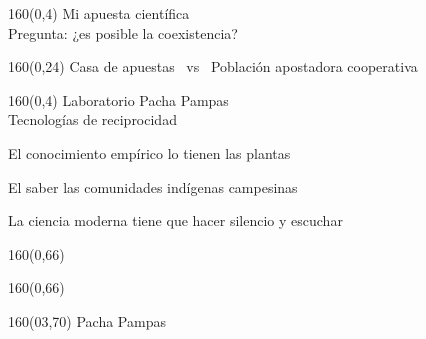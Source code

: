 \documentclass[shownotes,aspectratio=169]{beamer}
\begin{document}
\begin{frame}[plain]
\begin{textblock}{160}(0,4)
 \centering \LARGE Mi apuesta científica \\
 \Large Pregunta: ¿es posible la coexistencia?
 \end{textblock}
\vspace{1.25cm} \centering


\begin{textblock}{160}(0,24)
\large Casa de apuestas \ vs \  Población apostadora cooperativa
\end{textblock}


\end{frame}


\begin{frame}[plain]
\begin{textblock}{160}(0,4)
 \centering \LARGE Laboratorio Pacha Pampas \\
 \Large Tecnologías de reciprocidad
 \end{textblock}
\vspace{0.7cm} \centering


\Large 

El conocimiento empírico lo tienen las plantas

El saber las comunidades indígenas campesinas

La ciencia moderna tiene que hacer silencio y escuchar





\begin{textblock}{160}(0,66) \centering
\textcolor{black!85}{}
\end{textblock}
\begin{textblock}{160}(0,66) \centering
\textcolor{black!85}{}
\end{textblock}
\begin{textblock}{160}(03,70) \huge \centering
Pacha \hspace{1cm} Pampas
\end{textblock}



\end{frame}
\end{document}

